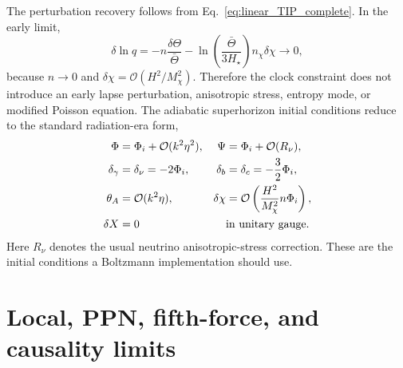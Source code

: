 \documentclass[aps,prd,reprint,nofootinbib,superscriptaddress,longbibliography]{revtex4-2}
\begin{document}
The perturbation recovery follows from Eq.~\eqref{eq:linear_TIP_complete}.  In the early limit,
\begin{equation}
  \delta\ln q= -n\frac{\delta\Theta}{\bar\Theta}
  -\ln\left(\frac{\bar\Theta}{3H_\star}\right)n_\chi\delta\chi
  \longrightarrow0,
  \label{eq:early_lapse_recovery}
\end{equation}
because $n\to0$ and $\delta\chi=\mathcal O(H^2/M_\chi^2)$.  Therefore the clock constraint does not introduce an early lapse perturbation, anisotropic stress, entropy mode, or modified Poisson equation.  The adiabatic superhorizon initial conditions reduce to the standard radiation-era form,
\begin{align}
  \Phi&=\Phi_i+\mathcal O(k^2\eta^2),
  &\Psi&=\Phi_i+\mathcal O(R_\nu),\label{eq:IC_phi}\\
  \delta_\gamma&=\delta_\nu=-2\Phi_i,
  &\delta_b&=\delta_c=-\frac32\Phi_i,\label{eq:IC_delta}\\
  \theta_A&=\mathcal O(k^2\eta),
  &\delta\chi&=\mathcal O\left(\frac{H^2}{M_\chi^2}n\Phi_i\right),\nonumber\\
  \delta X&=0 &&\hbox{in unitary gauge}.\label{eq:IC_chi}
\end{align}
Here $R_\nu$ denotes the usual neutrino anisotropic-stress correction.  These are the initial conditions a Boltzmann implementation should use.

\section{Local, PPN, fifth-force, and causality limits}
\label{sec:local_completion}
\end{document}
